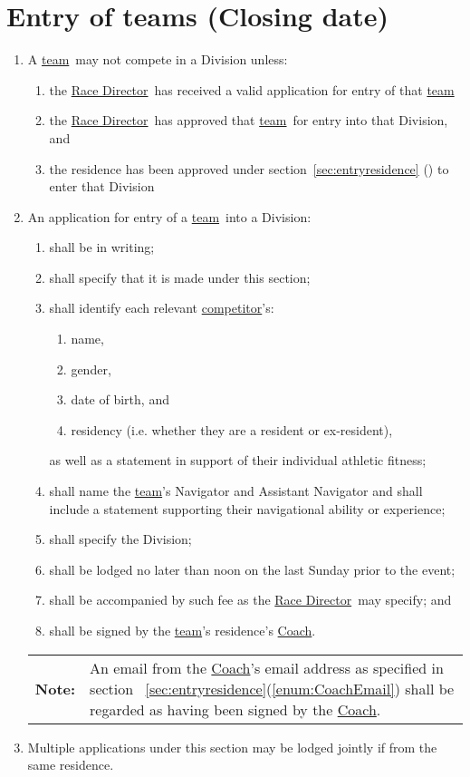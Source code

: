 \documentclass[12pt]{report}
\newcommand{\hyplink}[1]{\hyperlink{#1}{{#1}}}
\newcommand{\Coach}{\hyplink{Coach}}\newcommand{\xCaptain}{Coach}
\newcommand{\competitor}{\hyplink{competitor}}
\newcommand\Event{event}
\newcommand{\note}[1]{{\small%
\begin{tabular}
  {p{0.75cm}p{11.25cm}}
  \textbf{Note:}&#1
\end{tabular}
}}
\newcommand{\RaceDirector}{\hyplink{Race Director}}
\newcommand{\team}{\hyplink{team}}
\begin{document}
  \section{Entry of teams (Closing date)}\label{sec:EntryCompetitorDivision}
  \begin{enumerate}
    \item A \team\ may not compete in a Division unless:
     \begin{enumerate}
     \item  the \RaceDirector\ has received a valid application for entry of that \team\,
     \item  the \RaceDirector\ has approved that \team\ for entry into that Division, and
     \item the residence has been approved under section~\ref{sec:entryresidence} () to enter that Division
         \end{enumerate}
    \item An application for entry of a \team\ into a Division:
    \begin{enumerate}
      \item shall be in writing;
      \item shall specify that it is made under this section;
      \item shall identify each relevant \competitor's:
      \begin{enumerate}
        \item name,
        \item gender,
        \item date of birth, and
        \item residency (i.e. whether they are a resident or ex-resident),
      \end{enumerate}
      as well as a statement in support of their individual athletic fitness;
      \item shall name the \team's Navigator and Assistant Navigator and shall include a statement supporting their navigational ability or experience;
      \item shall specify the Division;
       \item shall be lodged no later than noon on the last Sunday prior to the \Event;
      \item shall be accompanied by such fee as the \RaceDirector\ may specify; and
      \item shall be signed by the \team's residence's \Coach.
    \end{enumerate}
    \note{An email from the \Coach's email address as specified in section~ \ref{sec:entryresidence}(\ref{enum:CoachEmail}) shall be regarded as having been signed by the \Coach.}
    \item Multiple applications under this section may be lodged jointly if from the same residence.
  \end{enumerate}
\end{document}
